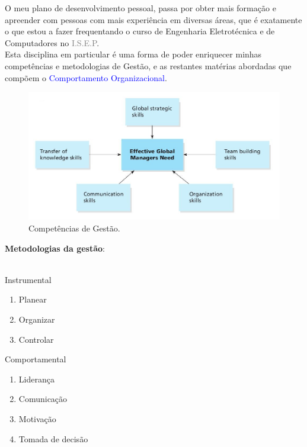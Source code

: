 O meu plano de desenvolvimento pessoal, passa por obter mais formação e apreender com pessoas com mais experiência em diversas áreas, que é exatamente o que estou a fazer frequentando o curso de Engenharia Eletrotécnica e de Computadores no \textcolor{gray}{I.S.E.P}.\\
Esta disciplina em particular é uma forma de poder enriquecer minhas competências e metodologias de Gestão, e as restantes matérias abordadas que compõem o \textcolor{blue}{Comportamento Organizacional}.\\
\begin{minipage}{10.3cm}
\begin{figure}[H]
	\begin{minipage}{\linewidth}
		\flushleft
		\includegraphics[scale=0.3]{"./image/Skills/Managerial Skills for the Global Marketplace.jpg"}
	\end{minipage}
	\caption{Competências de Gestão. \cite{book_6}}
\end{figure}
\end{minipage}
\begin{minipage}{12cm}
	\textbf{Metodologias da gestão}: \cite{book_9}\\
	\\
	\begin{minipage}{3.1cm}
		Instrumental
		\begin{enumerate}
			\setlength\itemsep{-0.3em}
			\item Planear
			\item Organizar
			\item Controlar\\
		\end{enumerate}
	\end{minipage}
	\begin{minipage}{5cm}
		Comportamental
		\begin{enumerate}
			\setlength\itemsep{-0.3em}
			\item Liderança
			\item Comunicação
			\item Motivação
			\item Tomada de decisão
		\end{enumerate}
	\end{minipage}
\end{minipage}





